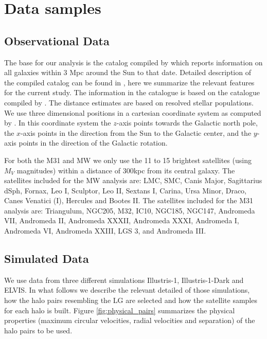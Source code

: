 \documentclass[a4paper,fleqn,usenatbib]{mnras}
\begin{document}
\section{Data samples}\label{sec:DataSamples}

\subsection{Observational Data}
\label{sec:obs}

The base for our analysis is the catalog compiled by
\cite{2014yCat..74351928P} which reports information on all 
galaxies within 3 Mpc around the Sun to that date. 
Detailed description of the compiled catalog can be found in
\cite{2013MNRAS.435.1928P}, here we summarize the relevant features
for the current study.
The information in the catalogue is based on the catalogue compiled by
\cite{2012AJ....144....4M}.
The distance estimates are based on resolved stellar populations. 
We use three dimensional positions in a cartesian coordinate system
as computed by \cite{2013MNRAS.435.1928P}.
In this coordinate system the $z$-axis points towards the Galactic north pole, the
$x$-axis points in the direction from the Sun to the Galactic center,
and the $y$-axis points in the direction of the Galactic rotation.


For both the M31 and MW we only use the 11 to 15 brightest satellites (using
$M_V$ magnitudes) within a distance of $300$kpc from its central galaxy.
The satellites included for the MW analysis are: 
LMC, SMC, Canis Major, Sagittarius dSph, Fornax, Leo I, Sculptor,
Leo II, Sextans I, Carina, Ursa Minor, Draco, Canes Venatici (I),
Hercules and Bootes II.
The satellites included for the M31 analysis are: Triangulum, NGC205,
M32, IC10, NGC185, NGC147, Andromeda VII, Andromeda II, Andromeda
XXXII, Andromeda XXXI, Andromeda I, Andromeda VI, Andromeda XXIII, LGS 3, 
 and Andromeda III.



\subsection{Simulated Data}
 
We use data from three different simulations Illustris-1,
Illustris-1-Dark and ELVIS. 
In what follows we describe the relevant detailed of those
simulations, how the halo pairs resembling the LG are selected and how
the satellite samples for each halo is built.
Figure \ref{fig:physical_pairs} summarizes the physical properties (maximum
circular velocities, radial velocities and separation) of the halo
pairs to be used.
\end{document}
